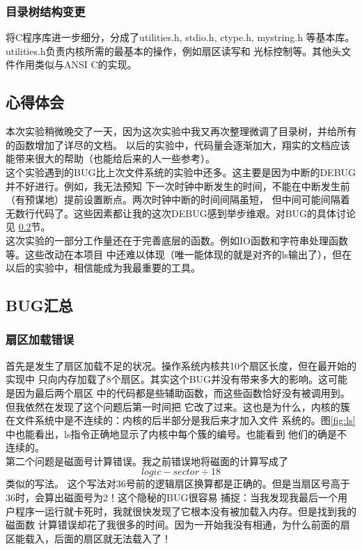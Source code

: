 \documentclass[a4paper]{article}
\begin{document}
    \subsubsection{目录树结构变更}
    将C程序库进一步细分，分成了utilities.h, stdio.h, ctype.h, mystring.h 
    等基本库。utilities.h负责内核所需的最基本的操作，例如扇区读写和
    光标控制等。其他头文件作用类似与ANSI C的实现。
    \subsection{心得体会}
    本次实验稍微晚交了一天，因为这次实验中我又再次整理微调了目录树，并给所有的函数增加了详尽的文档。
    以后的实验中，代码量会逐渐加大，翔实的文档应该能带来很大的帮助（也能给后来的人一些参考）。\\
    
    这个实验遇到的BUG比上次文件系统的实验中还多。这主要是因为中断的DEBUG并不好进行。例如，我无法预知
    下一次时钟中断发生的时间，不能在中断发生前（有预谋地）提前设置断点。两次时钟中断的时间间隔虽短，
    但中间可能间隔着无数行代码了。这些因素都让我的这次DEBUG感到举步维艰。对BUG的具体讨论见
    \ref{sec:bug}节。\\

    这次实验的一部分工作量还在于完善底层的函数。例如IO函数和字符串处理函数等。这些改动在本项目
    中还难以体现（唯一能体现的就是对齐的ls输出了），但在以后的实验中，相信能成为我最重要的工具。
    

    \subsection{BUG汇总}\label{sec:bug}
    \subsubsection{扇区加载错误}
    首先是发生了扇区加载不足的状况。操作系统内核共10个扇区长度，但在最开始的实现中
    只向内存加载了8个扇区。其实这个BUG并没有带来多大的影响。这可能是因为最后两个扇区
    中的代码都是些辅助函数，而这些函数恰好没有被调用到。但我依然在发现了这个问题后第一时间把
    它改了过来。这也是为什么，内核的簇在文件系统中是不连续的：内核的后半部分是我后来才加入文件
    系统的。图\ref{fig:ls}中也能看出，ls指令正确地显示了内核中每个簇的编号。也能看到
    他们的确是不连续的。\\
    
    第二个问题是磁面号计算错误。我之前错误地将磁面的计算写成了$$logic-sector \div 18$$类似的写法。
    这个写法对36号前的逻辑扇区换算都是正确的。但是当扇区号高于36时，会算出磁面号为2！这个隐秘的BUG很容易
    捕捉：当我发现我最后一个用户程序一运行就卡死时，我就很快发现了它根本没有被加载入内存。但是找到我的磁面数
    计算错误却花了我很多的时间。因为一开始我没有相通，为什么前面的扇区能载入，后面的扇区就无法载入了！
\end{document}
